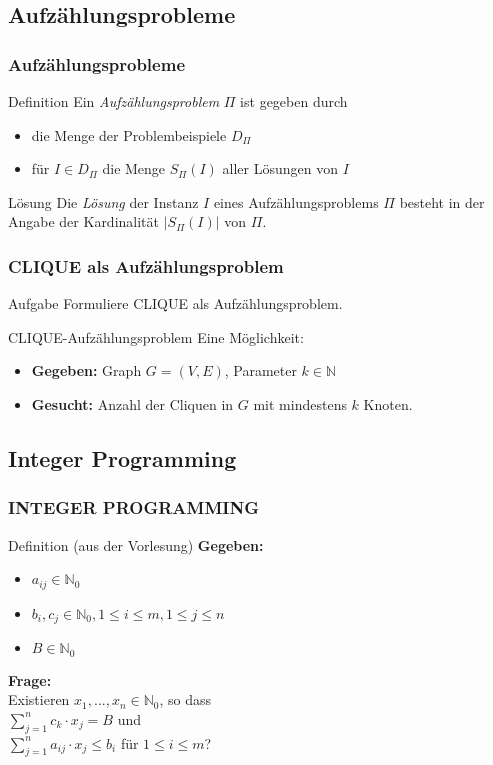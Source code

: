 \documentclass{beamer}
\begin{document}
{ \subsection{Aufzählungsprobleme}
\begin{frame}
 \frametitle{Aufzählungsprobleme}
 \begin{block}{Definition}
  Ein \emph{Aufzählungsproblem} $\Pi$ ist gegeben durch
  \begin{itemize}
   \item die Menge der Problembeispiele $D_\Pi$
   \item für $I \in D_\Pi$ die Menge $S_\Pi(I)$ aller Lösungen von $I$
  \end{itemize}
  \end{block}
  \begin{block}{Lösung}  
  Die \emph{Lösung} der Instanz $I$ eines Aufzählungsproblems $\Pi$ besteht in der Angabe der Kardinalität $|S_\Pi(I)|$ von $\Pi$.
 \end{block}
\end{frame}

 \begin{frame}
 \frametitle{CLIQUE als Aufzählungsproblem}
  \begin{block}{Aufgabe}
  Formuliere CLIQUE als Aufzählungsproblem.
\end{block}
\pause
\begin{block}{CLIQUE-Aufzählungsproblem}
Eine Möglichkeit:
\begin{itemize}
 \item \textbf{Gegeben: } Graph $G = (V,E)$, Parameter $k\in \mathbb{N}$
 \item \textbf{Gesucht: } Anzahl der Cliquen in $G$ mit mindestens $k$ Knoten.
 \end{itemize}
\end{block}
\end{frame}

\subsection{Integer Programming}
\begin{frame}
 \frametitle{INTEGER PROGRAMMING}
 \begin{block}{Definition (aus der Vorlesung)}
 \textbf{Gegeben: }
 \begin{itemize}
  \item $a_{ij} \in \mathbb{N}_0$
  \item $b_i, c_j \in \mathbb{N}_0, 1 \leq i \leq m, 1 \leq j \leq n$
  \item $B\in \mathbb{N}_0$
 \end{itemize}
\textbf{Frage: }\\
Existieren $x_1, ..., x_n \in \mathbb{N}_0$, so dass\\
 $\sum_{j=1}^n c_k \cdot x_j = B$ und \\
 $\sum_{j=1}^n a_{ij} \cdot x_j \leq b_i$ für $1 \leq i \leq m$?
 \end{block}
\end{frame}

}
\end{document}
